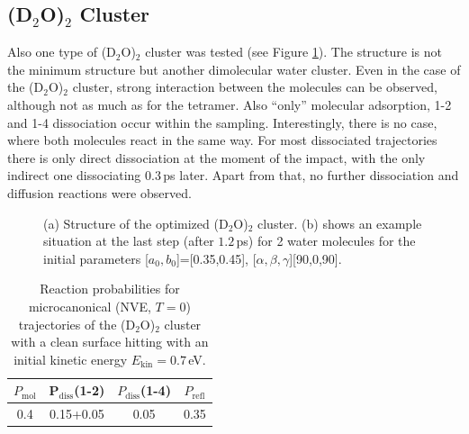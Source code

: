 \documentclass[11pt,DIV=13,BCOR=5mm,a4paper,headinclude]{scrbook}
\begin{document}
\subsection{(D$_2$O)$_2$ Cluster}
Also one type of (D$_2$O)$_2$ cluster was tested (see Figure \ref{abb:D2O2clusters}).
The structure is not the minimum structure but another dimolecular water cluster.
Even in the case of the (D$_2$O)$_2$ cluster, strong interaction between the molecules can be observed, although not as much as for the tetramer.
Also ``only'' molecular adsorption, 1-2 and 1-4 dissociation occur within the sampling.
Interestingly, there is no case, where both molecules react in the same way.
For most dissociated trajectories there is only direct dissociation at the moment of the impact, with the only indirect one dissociating $0.3\,$ps later.
Apart from that, no further dissociation and diffusion reactions were observed.
\begin{figure}[!t]
\centering
{}
         \quad
{}
          \quad
\caption{(a) Structure of the optimized (D$_2$O)$_2$ cluster.
(b) shows an example situation at the last step (after $1.2\,$ps) for 2 water molecules for the initial parameters [$a_0,b_0$]=[0.35,0.45], [$\alpha,\beta,\gamma$][90,0,90].}
       \label{abb:D2O2clusters}
\end{figure}

\begin{table}[!h]
 \centering
  \caption{Reaction probabilities for microcanonical (NVE, $T=0$) 
 trajectories of the (D$_2$O)$_2$ cluster with a clean surface 
 hitting with an initial kinetic energy $E_\textrm{kin}=0.7\,$eV.}
 \begin{tabular}{cccc}
\toprule
$P_\textrm{mol}$ & P$_\textrm{diss}$(1-2) &  $P_\textrm{diss}$(1-4) & $P_\textrm{refl}$ \\\midrule
0.4&0.15+0.05 & 0.05&0.35\\\bottomrule
\end{tabular}
 \label{tab:2D2O-prob}
\end{table}
\def\thefigure{D.\arabic{figure}}
\def\thetable{D.\arabic{table}}
\end{document}
